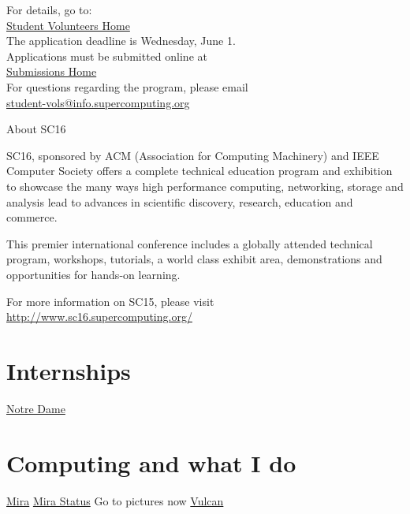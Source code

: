 \documentclass{article}
\begin{document}
For details, go to: \\
\href{http://sc16.supercomputing.org/studentssc/student-volunteers/}{Student Volunteers Home} \\
The application deadline is Wednesday, June 1. \\
Applications must be submitted online at \\
\href{https://submissions.supercomputing.org/}{Submissions Home} \\
For questions regarding the program, please email \\
\href{mailto:student-vols@info.supercomputing.org}{student-vols@info.supercomputing.org}

About SC16

SC16, sponsored by ACM (Association for Computing Machinery) and IEEE Computer Society offers a complete technical education program and exhibition to showcase the many ways high performance computing, networking, storage and analysis lead to advances in scientific discovery, research, education and commerce.

This premier international conference includes a globally attended technical program, workshops, tutorials, a world class exhibit area, demonstrations and opportunities for hands-on learning.

For more information on SC15, please visit \\
\href{http://www.sc16.supercomputing.org/}{http://www.sc16.supercomputing.org/}
\newpage

\section{Internships}
\href{https://jobs.nd.edu/}{Notre Dame}

\section{Computing and what I do}
\href{https://www.alcf.anl.gov/mira}{Mira}
\href{http://status.alcf.anl.gov/mira/activity}{Mira Status}
Go to pictures now
\href{http://computation.llnl.gov/computers/vulcan}{Vulcan}
\end{document}
